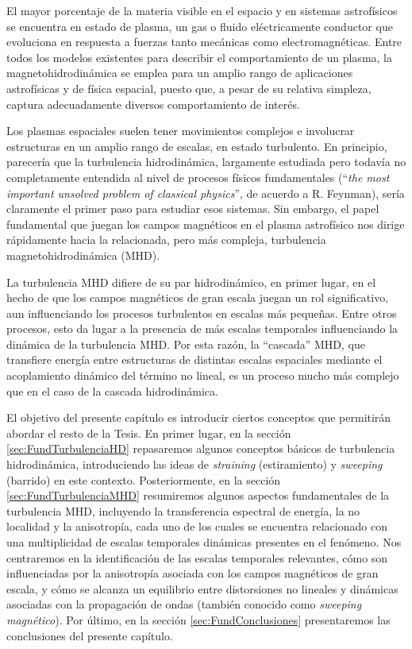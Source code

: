 El mayor porcentaje de la materia visible en el espacio y en sistemas
astrofísicos se encuentra en estado de plasma, un gas o fluido
eléctricamente conductor que evoluciona en respuesta a fuerzas tanto
mecánicas como electromagnéticas. Entre todos los modelos existentes
para describir el comportamiento de un plasma, la magnetohidrodinámica
se emplea para un amplio rango de aplicaciones astrofísicas y de
física espacial, puesto que, a pesar de su relativa simpleza, captura
adecuadamente diversos comportamiento de interés.

Los plasmas espaciales suelen tener movimientos complejos e involucrar
estructuras en un amplio rango de escalas, en estado turbulento. En
principio, parecería que la turbulencia hidrodinámica, largamente
estudiada pero todavía no completamente entendida al nivel de procesos
físicos fundamentales (``\textit{the most important unsolved problem
of classical physics}'', de acuerdo a R. Feynman), sería claramente el
primer paso para estudiar esos sistemas. Sin embargo, el papel
fundamental que juegan los campos magnéticos en el plasma astrofísico
nos dirige rápidamente hacia la relacionada, pero más compleja,
turbulencia magnetohidrodinámica (MHD).

La turbulencia MHD difiere de su par hidrodinámico, en primer lugar,
en el hecho de que los campos magnéticos de gran escala juegan un rol
significativo, aun influenciando los procesos turbulentos en escalas
más pequeñas. Entre otros procesos, esto da lugar a la presencia de
más escalas temporales influenciando la dinámica de la turbulencia
MHD. Por esta razón, la ``cascada'' MHD, que transfiere energía entre
estructuras de distintas escalas espaciales mediante el acoplamiento
dinámico del término no lineal, es un proceso mucho más complejo que
en el caso de la cascada hidrodinámica.

El objetivo del presente capítulo es introducir ciertos conceptos que
permitirán abordar el resto de la Tesis. En primer lugar, en la sección
\ref{sec:FundTurbulenciaHD} repasaremos algunos conceptos básicos de
turbulencia hidrodinámica, introduciendo las ideas de
\textit{straining} (estiramiento) y \textit{sweeping} (barrido) en
este contexto. Posteriormente, en la
sección \ref{sec:FundTurbulenciaMHD} resumiremos algunos aspectos
fundamentales de la turbulencia MHD, incluyendo la transferencia
espectral de energía, la no localidad y la anisotropía, cada uno de
los cuales se encuentra relacionado con una multiplicidad de escalas
temporales dinámicas presentes en el fenómeno.  Nos centraremos en la
identificación de las escalas temporales relevantes, cómo son
influenciadas por la anisotropía asociada con los campos magnéticos de
gran escala, y cómo se alcanza un equilibrio entre distorsiones no
lineales y dinámicas asociadas con la propagación de ondas (también
conocido como \textit{sweeping magnético}).  Por último, en la
sección \ref{sec:FundConclusiones} presentaremos las conclusiones del
presente capítulo.



